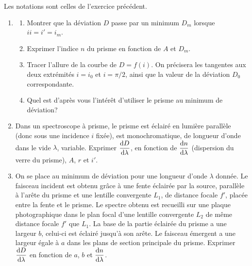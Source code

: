 \begin{exercice}%
  Les notations sont celles de l'exercice précédent.
  \begin{enumerate}
    \item
      \begin{enumerate}
        \item Montrer que la déviation \(D\) passe par un minimum \(D_m\) 
          lorsque \(ii=i'=i_m\).
        \item Exprimer l'indice \(n\) du prisme en fonction de \(A\) et 
          \(D_m\).
        \item Tracer l'allure de la courbe de \(D=f(i)\). On précisera les 
          tangentes aux deux extrémités \(i=i_0\) et \(i=\pi/2\), ainsi que 
          la valeur de la déviation \(D_0\) correspondante.
        \item Quel est d'après vous l'intérêt d'utiliser le prisme au 
          minimum de déviation?
      \end{enumerate}
    \item Dans un spectroscope à prisme, le prisme est éclairé en lumière 
      parallèle (donc sous une incidence \(i\) fixée), est monochromatique, 
      de longueur d'onde dans le vide \(\lambda\), variable. Exprimer 
      \(\dfrac{\mathrm{d} D}{\mathrm{d} \lambda}\), en fonction de \(\dfrac{\mathrm{d} n}{\mathrm{d} \lambda}\) 
      (dispersion du verre du prisme), \(A\), \(r\) et \(i'\).
    \item On se place au minimum de déviation pour une longueur d'onde 
      \(\lambda\) donnée. Le faisceau incident est obtenu grâce à une fente 
      éclairée par la source, parallèle à l'arête du prisme et une lentille 
      convergente \(L_1\), de distance focale \(f'\), placée entre la fente 
      et le prisme. Le spectre obtenu est recueilli sur une plaque 
      photographique dans le plan focal d'une lentille convergente \(L_2\) 
      de même distance focale \(f'\) que \(L_1\). La base de la partie 
      éclairée du prisme a une largeur \(b\), celui-ci est éclairé jusqu'à 
      son arête. Le faisceau émergent a une largeur égale à \(a\) dans les 
      plans de section principale du prisme. Exprimer 
      \(\dfrac{\mathrm{d} D}{\mathrm{d} \lambda}\) en fonction de \(a\), \(b\) et 
      \(\dfrac{\mathrm{d} n}{\mathrm{d} \lambda}\).
  \end{enumerate}
\end{exercice}%

